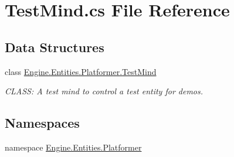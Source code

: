 \hypertarget{a00032}{}\section{Test\+Mind.\+cs File Reference}
\label{a00032}
\subsection*{Data Structures}
\begin{DoxyCompactItemize}
\item 
class \hyperlink{a00334}{Engine.\+Entities.\+Platformer.\+Test\+Mind}
\begin{DoxyCompactList}\small\item\em C\+L\+A\+SS\+: A test mind to control a test entity for demos. \end{DoxyCompactList}\end{DoxyCompactItemize}
\subsection*{Namespaces}
\begin{DoxyCompactItemize}
\item 
namespace \hyperlink{a00243}{Engine.\+Entities.\+Platformer}
\end{DoxyCompactItemize}
